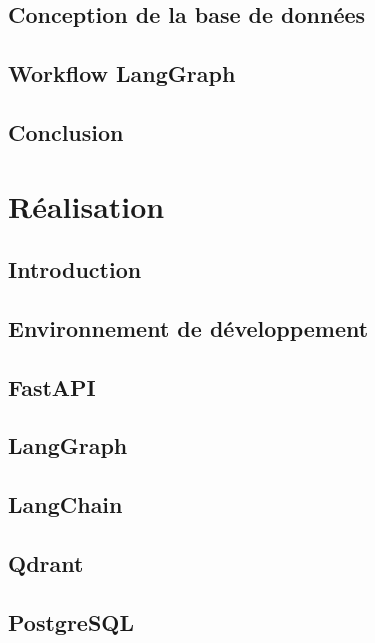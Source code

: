\documentclass[12pt,a4paper,oneside]{report}
\begin{document}
\section{Conception de la base de données}

\section{Workflow LangGraph}

\section{Conclusion}


\chapter{Réalisation}

\section{Introduction}

\section{Environnement de développement}

\section{FastAPI}

\section{LangGraph}

\section{LangChain}

\section{Qdrant}

\section{PostgreSQL}
\end{document}
